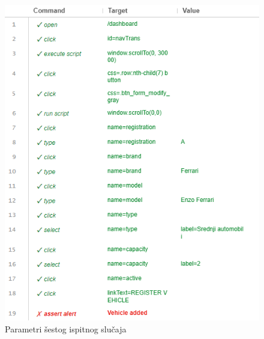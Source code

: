 			\begin{figure}[H]
				\centering
				\includegraphics[width=\textwidth]{"slike/Selenium/transport testovi/addVehicleBad_parametri.png"}
				\caption{Parametri šestog ispitnog slučaja}
				\label{fig: addVehicleBad_parametri}
			\end{figure}

